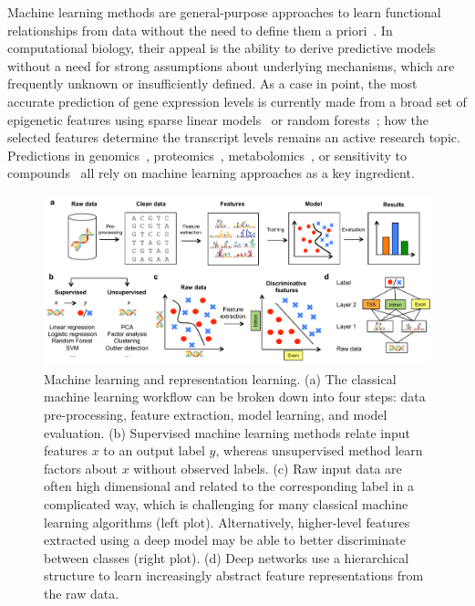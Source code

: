 Machine learning methods are general-purpose approaches to learn functional relationships from data without the need to define them a priori~\citep{hastie_elements_2005,michalski_machine_2013,murphy_machine_2012}. In computational biology, their appeal is the ability to derive predictive models without a need for strong assumptions about underlying mechanisms, which are frequently unknown or insufficiently defined. As a case in point, the most accurate prediction of gene expression levels is currently made from a broad set of epigenetic features using sparse linear models~\citep{cheng_statistical_2011,karlic_histone_2010} or random forests~\citep{li_using_2015}; how the selected features determine the transcript levels remains an active research topic. Predictions in genomics~\citep{libbrecht_machine_2015,martens_predicting_2016}, proteomics~\citep{swan_application_2013}, metabolomics~\citep{kell_metabolomics_2005}, or sensitivity to compounds~\citep{eduati_prediction_2015} all rely on machine learning approaches as a key ingredient.

\begin{figure}[htbp!]
\centering
\includegraphics[width=1.0\textwidth]{ml}
\caption[Machine learning and representation learning.]{Machine learning and representation learning. (a) The classical machine learning workflow can be broken down into four steps: data pre-processing, feature extraction, model learning, and model evaluation. (b) Supervised machine learning methods relate input features $x$ to an output label $y$, whereas unsupervised method learn factors about $x$ without observed labels. (c) Raw input data are often high dimensional and related to the corresponding label in a complicated way, which is challenging for many classical machine learning algorithms (left plot). Alternatively, higher-level features extracted using a deep model may be able to better discriminate between classes (right plot). (d) Deep networks use a hierarchical structure to learn increasingly abstract feature representations from the raw data.}
\label{fig:dl_ml}
\end{figure}


